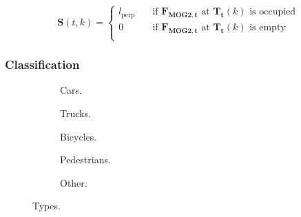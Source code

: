 \begin{displaymath}
\boldsymbol{S}(t,k) = 
\begin{cases}
l_{\text{perp}}        & \quad \text{if } \boldsymbol{F_{\text{MOG2},t}} \text{ at } \boldsymbol{T_t}(k) \text{ is occupied}\\
0		& \quad \text{if } \boldsymbol{F_{\text{MOG2},t}} \text{ at } \boldsymbol{T_t}(k)  \text{ is empty}\\
\end{cases}
\end{displaymath}

\subsubsection{Classification}
\begin{figure}[!h]
	\centering
	\begin{subfigure}[!h]{0.25\textwidth}
	
	\caption{Cars.}
	\end{subfigure}
	\quad
	\begin{subfigure}[!h]{0.25\textwidth}
	
	\caption{Trucks.}
	\end{subfigure}
	\quad
	\begin{subfigure}[!h]{0.21\textwidth}
	
	\caption{Bicycles.}
	\end{subfigure}
	\hfill
	\begin{subfigure}[!h]{0.3\textwidth}
	
	\caption{Pedestrians.}
	\end{subfigure}
	\quad
	\begin{subfigure}[!h]{0.5\textwidth}
	
	\caption{Other.}
	\end{subfigure}

	\caption{Types.\label{fig:types}}
\end{figure}



